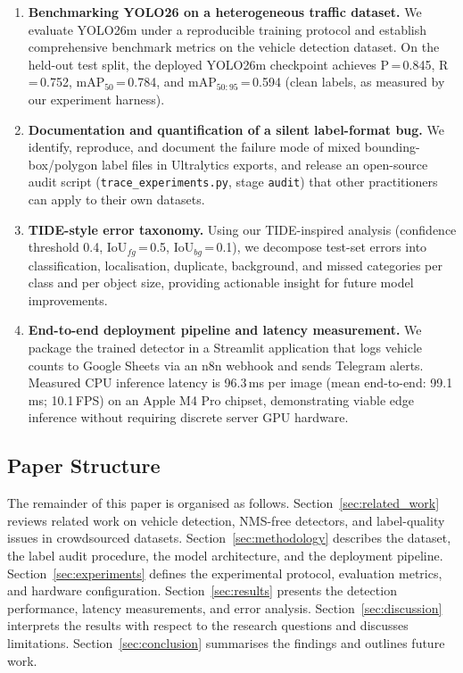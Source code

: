 \begin{enumerate}
\item \textbf{Benchmarking YOLO26 on a heterogeneous traffic dataset.}
  We evaluate YOLO26m under a reproducible training protocol and establish
  comprehensive benchmark metrics on the vehicle detection dataset.
  On the held-out test split, the deployed YOLO26m checkpoint achieves
  P\,=\,0.845, R\,=\,0.752, mAP$_{50}$\,=\,0.784, and
  mAP$_{50:95}$\,=\,0.594 (clean labels, as measured by our experiment harness).

\item \textbf{Documentation and quantification of a silent label-format bug.}
  We identify, reproduce, and document the failure mode of mixed bounding-box/polygon
  label files in Ultralytics exports, and release an open-source audit script
  (\texttt{trace\_experiments.py}, stage \texttt{audit}) that other practitioners can
  apply to their own datasets.

\item \textbf{TIDE-style error taxonomy.}
  Using our TIDE-inspired analysis (confidence threshold 0.4, IoU$_{fg}$\,=\,0.5,
  IoU$_{bg}$\,=\,0.1), we decompose test-set errors into classification, localisation,
  duplicate, background, and missed categories per class and per object size,
  providing actionable insight for future model improvements.

\item \textbf{End-to-end deployment pipeline and latency measurement.}
  We package the trained detector in a Streamlit application that logs vehicle counts
  to Google Sheets via an n8n webhook and sends Telegram alerts.
  Measured CPU inference latency is 96.3\,ms per image (mean end-to-end: 99.1\,ms;
  10.1\,FPS) on an Apple M4 Pro chipset, demonstrating viable edge inference without
  requiring discrete server GPU hardware.
\end{enumerate}

\subsection{Paper Structure}

The remainder of this paper is organised as follows.
Section~\ref{sec:related_work} reviews related work on vehicle detection, NMS-free
detectors, and label-quality issues in crowdsourced datasets.
Section~\ref{sec:methodology} describes the dataset, the label audit procedure, the
model architecture, and the deployment pipeline.
Section~\ref{sec:experiments} defines the experimental protocol, evaluation metrics,
and hardware configuration.
Section~\ref{sec:results} presents the detection performance, latency measurements,
and error analysis.
Section~\ref{sec:discussion} interprets the results with respect to the research
questions and discusses limitations.
Section~\ref{sec:conclusion} summarises the findings and outlines future work.
